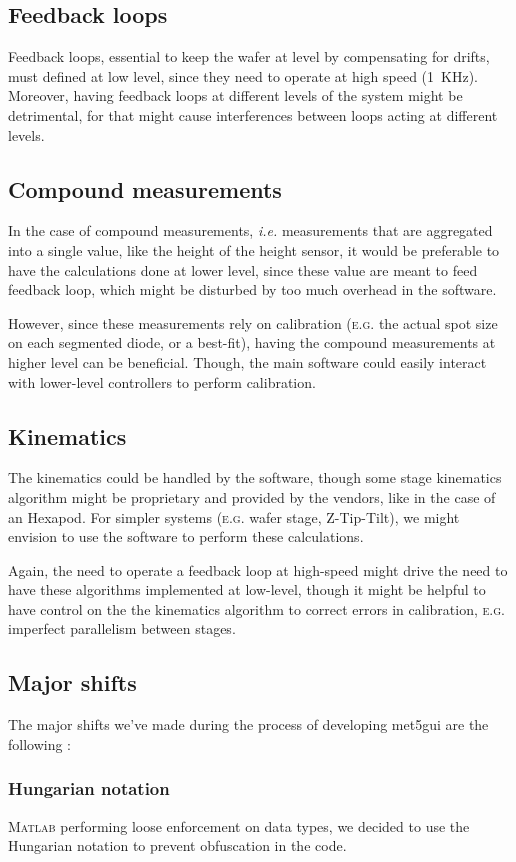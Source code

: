 \documentclass[10pt,letter,twoside]{report}
\begin{document}
\subsection{Feedback loops}
Feedback loops, essential to keep the wafer at level by compensating for drifts, must defined at low level, since they need to operate at high speed (1~KHz).
Moreover, having feedback loops at different levels of the system might be detrimental, for that might cause interferences between loops acting at different levels.

\subsection{Compound measurements}
In the case of compound measurements, \textit{i.e.} measurements that are aggregated into a single value, like the height of the height sensor, it would be preferable to have the calculations done at lower level, since these value are meant to feed feedback loop, which might be disturbed by too much overhead in the software.

However, since these measurements rely on calibration (\textsc{e.g.} the actual spot size on each segmented diode, or a best-fit), having the compound measurements at higher level can be beneficial. Though, the main software could easily interact with lower-level controllers to perform calibration.

\subsection{Kinematics}
The kinematics could be handled by the software, though some stage kinematics algorithm might be proprietary and provided by the vendors, like in the case of an Hexapod.
For simpler systems (\textsc{e.g.} wafer stage, Z-Tip-Tilt), we might envision to use the software to perform these calculations.

Again, the need to operate a feedback loop at high-speed might drive the need to have these algorithms implemented at low-level, though it might be helpful to have control on the the kinematics algorithm to correct errors in calibration, \textsc{e.g.} imperfect parallelism between stages.

\subsection{Major shifts}
The major shifts we've made during the process of developing met5gui are the following :
\subsubsection{Hungarian notation}
\textsc{Matlab} performing loose enforcement on data types, we decided to use the Hungarian notation to prevent obfuscation in the code. 
\end{document}
